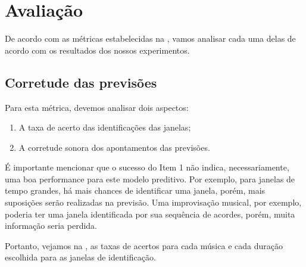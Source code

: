 \section{Avaliação}

De acordo com as métricas estabelecidas na , vamos analisar cada uma delas de acordo com os resultados dos nossos experimentos.

\subsection{Corretude das previsões}

Para esta métrica, devemos analisar dois aspectos:

\begin{enumerate}
    \item A taxa de acerto das identificações das janelas;
    \item A corretude sonora dos apontamentos das previsões.
\end{enumerate}

É importante mencionar que o sucesso do Item 1 não indica, necessariamente, uma boa performance para este modelo preditivo. Por exemplo, para janelas de tempo grandes, há mais chances de identificar uma janela, porém, mais suposições serão realizadas na previsão. Uma improvisação musical, por exemplo, poderia ter uma janela identificada por sua sequência de acordes, porém, muita informação seria perdida.

Portanto, vejamos na , as taxas de acertos para cada música e cada duração escolhida para as janelas de identificação.

\renewcommand{\arraystretch}{2}

